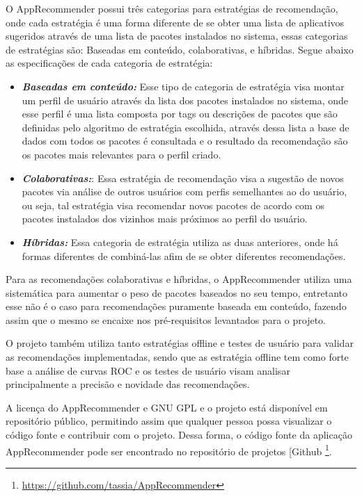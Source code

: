 O AppRecommender possui três categorias para estratégias de recomendação, onde cada
estratégia é uma forma diferente de se obter uma lista de aplicativos sugeridos
através de uma lista de pacotes instalados no sistema, essas categorias de estratégias
são: Baseadas em conteúdo, colaborativas, e híbridas. Segue abaixo as especificações
de cada categoria de estratégia:

\begin{itemize}
    \item \textit{\textbf{Baseadas em conteúdo:}} Esse tipo de categoria de estratégia
        visa montar um perfil de usuário através da lista dos pacotes instalados no sistema,
        onde esse perfil é uma lista composta por tags ou descrições de pacotes que são
        definidas pelo algoritmo de estratégia escolhida, através dessa lista a base de dados
        com todos os pacotes é consultada e o resultado da recomendação são os pacotes mais
        relevantes para o perfil criado.
    \item \textit{\textbf{Colaborativas:}}: Essa estratégia de recomendação visa
        a sugestão de novos pacotes via análise de outros usuários com perfis
        semelhantes ao do usuário, ou seja, tal estratégia visa recomendar novos
        pacotes de acordo com os pacotes instalados dos vizinhos mais próximos
        ao perfil do usuário.
    \item \textit{\textbf{Híbridas:}} Essa categoria
        de estratégia utiliza as duas anteriores, onde há formas diferentes de combiná-las
    afim de se obter diferentes recomendações.
\end{itemize}

Para as recomendações colaborativas e híbridas, o AppRecommender
utiliza uma sistemática para aumentar o peso de pacotes baseados no seu tempo,
entretanto esse não é o caso para recomendações puramente baseada em conteúdo,
fazendo assim que o mesmo se encaixe nos pré-requisitos levantados para o
projeto.

O projeto também utiliza tanto estratégias offline e testes de usuário para
validar as recomendações implementadas, sendo que as estratégia offline tem como
forte base a análise de curvas ROC e os testes de usuário visam analisar
principalmente a precisão e novidade das recomendações.

A licença do AppRecommender e GNU GPL e o projeto está disponível em repositório
público, permitindo assim que qualquer pessoa possa visualizar o código fonte e
contribuir com o projeto. Dessa forma, o código fonte da aplicação
AppRecommender pode ser encontrado no repositório de projetos [Github \footnote{\url{https://github.com/tassia/AppRecommender}}.

